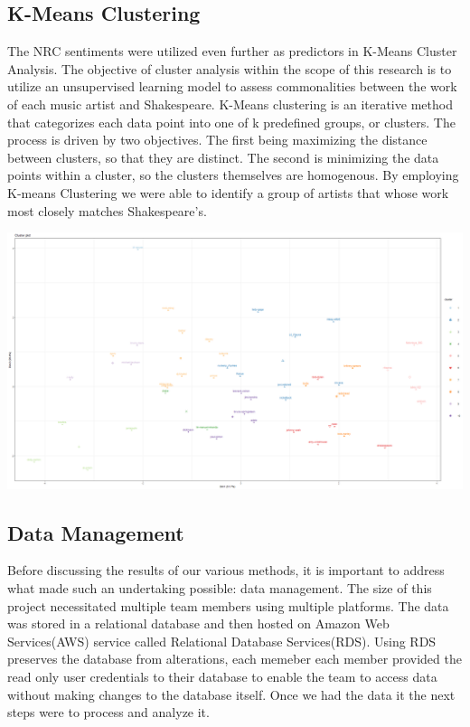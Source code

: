 \documentclass[11pt]{article}
\begin{document}


\subsection{K-Means Clustering}
The NRC sentiments were utilized even further as predictors in K-Means Cluster Analysis. The objective of cluster analysis within the scope of this research is to utilize an unsupervised learning model \cite{k-means} to assess commonalities between the work of each music artist and Shakespeare. K-Means clustering is an iterative method that categorizes each data point into one of k predefined groups, or clusters. The process is driven by two objectives. The first being maximizing the distance between clusters, so that they are distinct. The second is minimizing the data points within a cluster, so the clusters themselves are homogenous. \cite{k-means} By employing K-means Clustering we were able to identify a group of artists that whose work most closely matches Shakespeare’s. 

\begin{center}
\includegraphics[width=14cm]{_assets/ClusterAnalysis_Fit10.png}
\end{center}

\subsection{Data Management}
Before discussing the results of our various methods, it is important to address what made such an undertaking possible: data management.  The size of this project necessitated multiple team members using multiple platforms. The data was stored in a relational database and then hosted on  Amazon Web Services(AWS) service called Relational Database Services(RDS). Using RDS preserves the database from alterations, each memeber each member provided the read only user credentials to their database to enable the team to access data without making changes to the database itself. Once we had the data it the next steps were to process and analyze it. 
\end{document}
